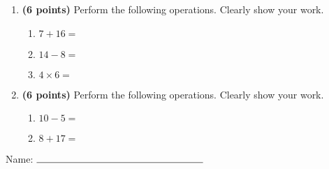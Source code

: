 \documentclass[12pt]{amsart}
\begin{document}
\newpage
\begin{enumerate}
\item {\bf (6 points)} 
 Perform the following operations. Clearly show your work. \begin{enumerate}


\def \a{7}\def \b{16}\def \apb{23}

 
\item $\a + \b = $

\vspace{2cm}
\def \a{14}\def \dif{6}\def \b{8}

 
\item $\a - \b = $

\vspace{2cm}
\def \a{4}\def \b{6}\def \ab{10}

 
\item $\a \times \b = $ 

\vspace{2cm}
\def \vshift{-5}\def \hshift{0}\def \chang{-2}\def \findval{-2}\def \yval{-1}

 
\end{enumerate}


\newpage
\item {\bf (6 points)} 
 Perform the following operations. Clearly show your work. \begin{enumerate}


\def \a{10}\def \dif{5}\def \b{5}

 
\item $\a - \b = $

\vspace{2cm}
\def \a{8}\def \b{17}\def \apb{25}

 
\item $\a + \b = $

\vspace{2cm}
\def \vshift{1}\def \hshift{0}\def \chang{-1}\def \findval{-1}\def \yval{3}

 
\end{enumerate}


\newpage\end{enumerate}\graphicspath{{/Users/jilan/Downloads/Randomizer/Randomizer/Sample Course/Sample Assessment 2/}}\setcounter{page}{1}


\thispagestyle{fancy}

 
\noindent Name: $\rule{6cm}{0.15mm}$

\vspace{.2cm}
\end{document}

